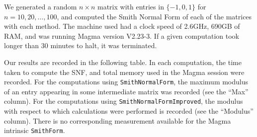 \documentclass[12pt,a4paper,answers]{exam}
\theoremstyle{definition}
\begin{document}
We generated a random $n\times n$ matrix with entries in $\{-1,0,1\}$ for $n=10,20,\ldots,100$, and computed the Smith Normal Form of each of the matrices with each method. The machine used had a clock speed of 2.6GHz, 690GB of RAM, and was running {\sc Magma} version V2.23-3. If a given computation took longer than 30 minutes to halt, it was terminated.

Our results are recorded in the following table. In each computation, the time taken to compute the SNF, and total memory used in the {\sc Magma} session were recorded. For the computations using \texttt{SmithNormalForm}, the maximum modulus of an entry appearing in some intermediate matrix was recorded (see the ``Max'' column). For the computations using \texttt{SmithNormalFormImproved}, the modulus with respect to which calculations were performed is recorded (see the ``Modulus'' column). There is no corresponding measurement available for the {\sc Magma} intrinsic \texttt{SmithForm}.

  {\centering
  }\newline
\end{document}
